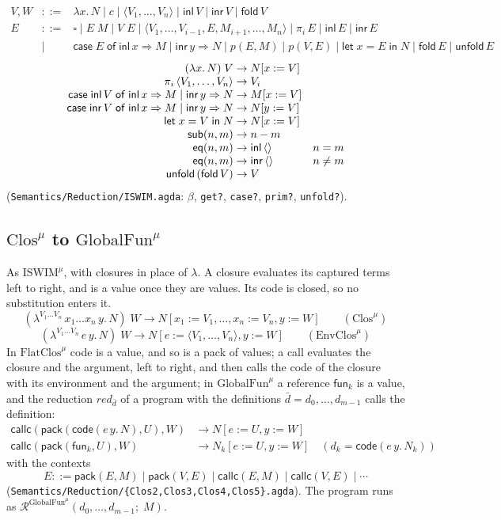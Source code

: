 \documentclass[10pt]{article}
\theoremstyle{acmplain}
\newcommand{\key}[1]{\mathsf{#1}}
\newcommand{\lam}[1]{\lambda #1.\,}
\newcommand{\clos}[2]{\lambda^{#1}\, #2.\,}
\newcommand{\Let}{\key{let}\;}
\newcommand{\In}{\;\key{in}\;}
\newcommand{\inl}{\key{inl}\,}
\newcommand{\inr}{\key{inr}\,}
\newcommand{\Case}[5]{\key{case}\;#1\;\key{of}\;\key{inl}\,#2 \Rightarrow #3 \mid \key{inr}\,#4 \Rightarrow #5}
\newcommand{\tuple}[1]{\langle #1 \rangle}
\newcommand{\prj}[1]{\pi_{#1}\,}
\newcommand{\funref}[1]{\key{fun}_{#1}}
\newcommand{\emptytup}{\langle\rangle}
\newcommand{\prim}[3]{#1(#2, #3)}
\newcommand{\Tcodetm}[3]{\key{code}(#1\,#2.\,#3)}  %
\newcommand{\Tpack}[2]{\key{pack}(#1, #2)}     %
\newcommand{\Tcallc}[2]{\key{callc}(#1, #2)}   %
\newcommand{\Ml}[1]{\textrm{#1}^{\mu}}                  %
\newcommand{\Mfold}{\key{fold}\,}
\newcommand{\Munfold}{\key{unfold}\,}
\begin{document}
\[
\begin{array}{rcl}
  V, W &::=& \lam{x} N \mid c \mid \tuple{V_1, \ldots, V_n} \mid \inl V \mid \inr V
    \mid \Mfold V \\
  E &::=& \square \mid E\;M \mid V\;E \mid \tuple{V_1, \ldots, V_{i-1}, E, M_{i+1}, \ldots, M_n}
    \mid \prj{i} E \mid \inl E \mid \inr E \\
  &\mid& \Case{E}{x}{M}{y}{N} \mid \prim{p}{E}{M} \mid \prim{p}{V}{E}
    \mid \Let x = E \In N \mid \Mfold E \mid \Munfold E
\end{array}
\]
\[
\begin{array}{@{}r@{\;\to\;}l@{\quad}l@{}}
  (\lam{x} N)\;V & N[x := V] \\
  \prj{i} \tuple{V_1, \ldots, V_n} & V_i \\
  \Case{\inl V}{x}{M}{y}{N} & M[x := V] \\
  \Case{\inr V}{x}{M}{y}{N} & N[y := V] \\
  \Let x = V \In N & N[x := V] \\
  \prim{\key{sub}}{n}{m} & n - m \\
  \prim{\key{eq}}{n}{m} & \inl \emptytup & n = m \\
  \prim{\key{eq}}{n}{m} & \inr \emptytup & n \neq m \\
  \Munfold (\Mfold V) & V
\end{array}
\]
(\texttt{Semantics/Reduction/ISWIM.agda}: $\beta$, \texttt{get?}, \texttt{case?},
\texttt{prim?}, \texttt{unfold?}).

\subsection{\texorpdfstring{$\Ml{Clos}$ to $\Ml{GlobalFun}$}{Clos-mu to GlobalFun-mu}}

As $\Ml{ISWIM}$, with closures in place of $\lambda$. A closure evaluates
its captured terms left to right, and is a value once they are values. Its
code is closed, so no substitution enters it.
\[
  (\clos{V_1\ldots V_n}{x_1\ldots x_n\, y} N)\;W \to N[x_1 := V_1, \ldots, x_n := V_n, y := W]
  \qquad (\Ml{Clos})
\]
\[
  (\clos{V_1\ldots V_n}{e\, y} N)\;W \to N[e := \tuple{V_1, \ldots, V_n}, y := W]
  \qquad (\Ml{EnvClos})
\]
In $\Ml{FlatClos}$ code is a value, and so is a pack of values; a call
evaluates the closure and the argument, left to right, and then calls the
code of the closure with its environment and the argument; in $\Ml{GlobalFun}$
a reference $\funref{k}$ is a value, and the reduction
$\mathit{red}_{\bar{d}}$ of a program with the definitions
$\bar{d} = d_0, \ldots, d_{m-1}$ calls the definition:
\begin{align*}
  \Tcallc{\Tpack{\Tcodetm{e}{y}{N}}{U}}{W} &\to N[e := U, y := W] \\
  \Tcallc{\Tpack{\funref{k}}{U}}{W} &\to N_k[e := U, y := W] \quad (d_k = \Tcodetm{e}{y}{N_k})
\end{align*}
with the contexts
\[
  E ::= \Tpack{E}{M} \mid \Tpack{V}{E} \mid \Tcallc{E}{M} \mid \Tcallc{V}{E} \mid \cdots
\]
(\texttt{Semantics/\allowbreak Reduction/\allowbreak \{Clos2,Clos3,Clos4,Clos5\}.agda}). The program
runs as $\mathcal{R}^{\Ml{GlobalFun}}(d_0, \ldots, d_{m-1};\; M)$.
\end{document}
